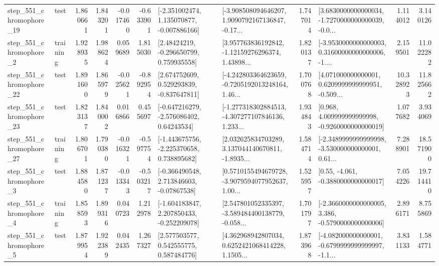 \begin{tabular}{llrrrrllrlrr}
  step\_551\_chromophore\_19 &      test &      1.860661 &    1.843201 &     -0.017460 & -0.633901 &   [-2.351002474, 1.135070877, -0.007886166] &  [-3.908508094646207, 1.9090792167136847, -0.17... &       1.747014 &  [3.6830000000000034, -1.7270000000000039, -0.0... &            1.114012 &          3.140126 \\
   step\_551\_chromophore\_2 &  training &      1.928935 &    1.988624 &      0.059689 &  1.815030 &     [2.48424219, -0.296650799, 0.759935558] &  [3.957763836192842, -1.12159276296374, 1.43898... &       1.820137 &  [-3.9530000000000003, 0.31600000000000006, -1.... &            2.159501 &         11.022282 \\
  step\_551\_chromophore\_22 &      test &      1.891600 &    1.865979 &     -0.025621 & -0.892954 &    [2.674752609, 0.529293839, -0.837647811] &  [-4.242803364623659, -0.7205192013248164, 1.46... &       1.700768 &  [4.071000000000001, 0.6209999999999951, -0.509... &           10.328923 &         11.825662 \\
  step\_551\_chromophore\_23 &      test &      1.823137 &    1.840002 &      0.016866 &  0.455697 &    [-0.647216279, -2.576086402, 0.64243534] &  [-1.277318302884513, -4.307277107846136, 1.233... &       1.934843 &    [0.968, 4.009999999999998, -0.9260000000000019] &            1.077682 &          3.934069 \\
  step\_551\_chromophore\_27 &  training &      1.806701 &    1.790380 &     -0.016321 & -0.597754 &   [-1.443675756, -2.225370658, 0.738895682] &  [2.032625834703289, 3.137044140670811, -1.8935... &       1.584714 &  [-2.3489999999999998, -3.530000000000001, 0.61... &            7.288901 &         18.571900 \\
   step\_551\_chromophore\_3 &      test &      1.884580 &    1.871237 &     -0.013343 & -0.503217 &    [-0.366490548, 2.713846603, -0.07867538] &  [0.5710155494679728, -3.9079594077952637, 1.00... &       1.525957 &                [0.55, -4.061, -0.3880000000000017] &            7.054226 &         19.714410 \\
   step\_551\_chromophore\_4 &  training &      1.858593 &    1.899316 &      0.040723 &  1.212978 &   [-1.604183847, 2.207850433, -0.252209078] &  [2.547801052335397, -3.589484400138779, -0.058... &       1.701797 &  [-2.3660000000000005, 3.386, -0.5790000000000006] &            2.896171 &          8.755869 \\
   step\_551\_chromophore\_5 &      test &      1.879954 &    1.922389 &      0.042435 &  1.267327 &     [2.577503577, 0.542555775, 0.587484776] &  [4.362968942807034, 0.6252421068414228, 1.1505... &       1.873968 &  [-4.082000000000001, -0.6799999999999997, -1.1... &            3.831133 &          1.584771 \\

\end{tabular}
